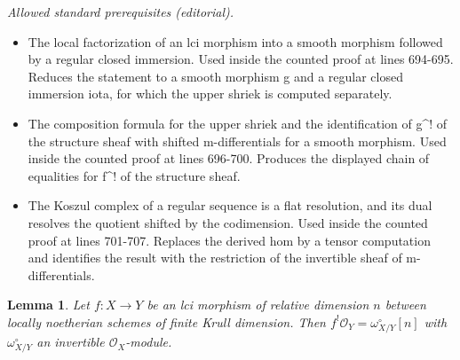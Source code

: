 \documentclass[10pt,a4paper]{amsart}
\numberwithin{equation}{section}
\newtheorem{lem}[prop]{Lemma}
\theoremstyle{definition}
\newcommand{\s}[1]{\mathscr{#1}}
\begin{document}
\noindent\textit{Allowed standard prerequisites (editorial).}\begin{itemize}
\item The local factorization of an lci morphism into a smooth morphism followed by a regular closed immersion. Used inside the counted proof at lines 694-695. Reduces the statement to a smooth morphism g and a regular closed immersion iota, for which the upper shriek is computed separately.
\item The composition formula for the upper shriek and the identification of g\textasciicircum{}! of the structure sheaf with shifted m-differentials for a smooth morphism. Used inside the counted proof at lines 696-700. Produces the displayed chain of equalities for f\textasciicircum{}! of the structure sheaf.
\item The Koszul complex of a regular sequence is a flat resolution, and its dual resolves the quotient shifted by the codimension. Used inside the counted proof at lines 701-707. Replaces the derived hom by a tensor computation and identifies the result with the restriction of the invertible sheaf of m-differentials.
\end{itemize}\medskip
\begin{lem}
\label{fOy}
Let $f: X\to Y$ be an lci morphism of relative dimension $n$ between locally noetherian schemes of finite Krull dimension. Then $f^!\s{O}_Y = \omega^{\circ}_{X/Y}[n]$ with $\omega^{\circ}_{X/Y}$ an invertible $\s{O}_X$-module.
\end{lem}
\end{document}
